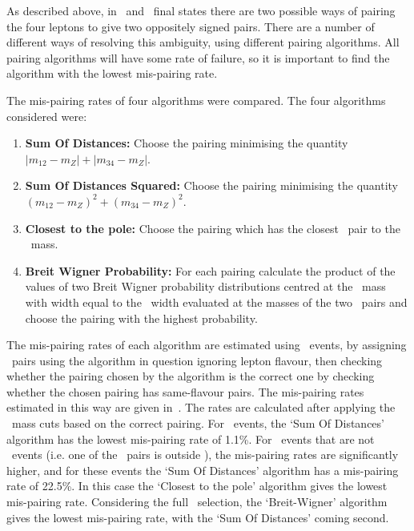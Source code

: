 As described above, in \eeee\ and \mmmm\ final states there are two possible
ways of pairing the four leptons to give two oppositely signed pairs. There are
a number of different ways of resolving this ambiguity, using different pairing
algorithms. All pairing algorithms will have some rate of failure, so it is
important to find the algorithm with the lowest mis-pairing rate.

The mis-pairing rates of four algorithms were compared. The four algorithms
considered were:

\begin{enumerate}
    \item {\bf Sum Of Distances:} Choose the pairing minimising the quantity
    ${|m_{12}-m_{Z}|+|m_{34}-m_{Z}|}$.
    \item {\bf Sum Of Distances Squared:} Choose the pairing minimising the quantity
    $(m_{12}-m_{Z})^{2}+(m_{34}-m_{Z})^{2}$.
    \item {\bf Closest to the pole:} Choose the pairing which has the closest
    \dilep\ pair to the \Z\ mass.
    \item {\bf Breit Wigner Probability:} For each pairing calculate the product
    of the values of two Breit Wigner probability distributions centred at the \Z\ mass with
    width equal to the \Z\ width evaluated at the masses of the two \dilep\
    pairs and choose the pairing with the highest probability.
\end{enumerate}

The mis-pairing rates of each algorithm are estimated using \ZZeemm\ events, by
assigning \dilep\ pairs using the algorithm in question ignoring
lepton flavour, then checking whether the
pairing chosen by the algorithm is the correct one by checking whether the
chosen pairing has same-flavour pairs.
The mis-pairing rates estimated in this way are given in~. The
rates are calculated after applying the \Z\ mass cuts based on the correct
pairing. For
\ZZ\ events, the `Sum Of Distances' algorithm has the lowest mis-pairing rate of
1.1\%.
For \ZZs\ events that are not \ZZ\ events (i.e. one of the \dilep\ pairs is
outside \sstooos), the mis-pairing rates are significantly higher, and for these
events the  `Sum Of Distances' algorithm has a mis-pairing rate of 22.5\%. In
this case the `Closest to the pole' algorithm gives the lowest mis-pairing rate.
Considering the full \ZZs\ selection, the `Breit-Wigner' algorithm gives the
lowest mis-pairing rate, with the `Sum Of Distances' coming second.

